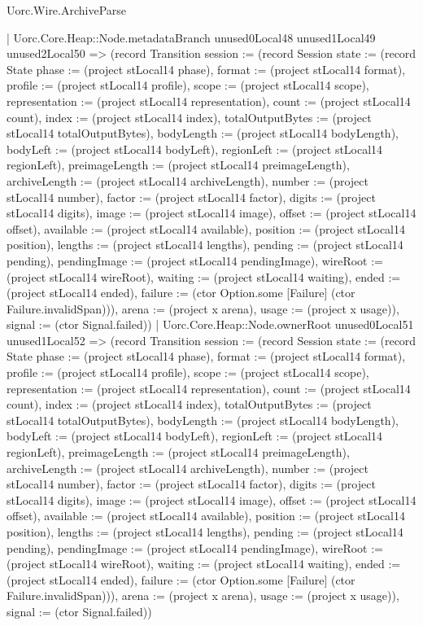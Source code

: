 \begin{lexlean}{Uorc.Wire.ArchiveParse}
\begin{semanticmodule}
{            | Uorc.Core.Heap::Node.metadataBranch unused0Local48 unused1Local49 unused2Local50 => (record Transition {session := (record Session {state := (record State {phase := (project stLocal14 phase), format := (project stLocal14 format), profile := (project stLocal14 profile), scope := (project stLocal14 scope), representation := (project stLocal14 representation), count := (project stLocal14 count), index := (project stLocal14 index), totalOutputBytes := (project stLocal14 totalOutputBytes), bodyLength := (project stLocal14 bodyLength), bodyLeft := (project stLocal14 bodyLeft), regionLeft := (project stLocal14 regionLeft), preimageLength := (project stLocal14 preimageLength), archiveLength := (project stLocal14 archiveLength), number := (project stLocal14 number), factor := (project stLocal14 factor), digits := (project stLocal14 digits), image := (project stLocal14 image), offset := (project stLocal14 offset), available := (project stLocal14 available), position := (project stLocal14 position), lengths := (project stLocal14 lengths), pending := (project stLocal14 pending), pendingImage := (project stLocal14 pendingImage), wireRoot := (project stLocal14 wireRoot), waiting := (project stLocal14 waiting), ended := (project stLocal14 ended), failure := (ctor Option.some [Failure] (ctor Failure.invalidSpan))}), arena := (project x arena), usage := (project x usage)}), signal := (ctor Signal.failed)})
            | Uorc.Core.Heap::Node.ownerRoot unused0Local51 unused1Local52 => (record Transition {session := (record Session {state := (record State {phase := (project stLocal14 phase), format := (project stLocal14 format), profile := (project stLocal14 profile), scope := (project stLocal14 scope), representation := (project stLocal14 representation), count := (project stLocal14 count), index := (project stLocal14 index), totalOutputBytes := (project stLocal14 totalOutputBytes), bodyLength := (project stLocal14 bodyLength), bodyLeft := (project stLocal14 bodyLeft), regionLeft := (project stLocal14 regionLeft), preimageLength := (project stLocal14 preimageLength), archiveLength := (project stLocal14 archiveLength), number := (project stLocal14 number), factor := (project stLocal14 factor), digits := (project stLocal14 digits), image := (project stLocal14 image), offset := (project stLocal14 offset), available := (project stLocal14 available), position := (project stLocal14 position), lengths := (project stLocal14 lengths), pending := (project stLocal14 pending), pendingImage := (project stLocal14 pendingImage), wireRoot := (project stLocal14 wireRoot), waiting := (project stLocal14 waiting), ended := (project stLocal14 ended), failure := (ctor Option.some [Failure] (ctor Failure.invalidSpan))}), arena := (project x arena), usage := (project x usage)}), signal := (ctor Signal.failed)})
}
\end{semanticmodule}
\end{lexlean}
